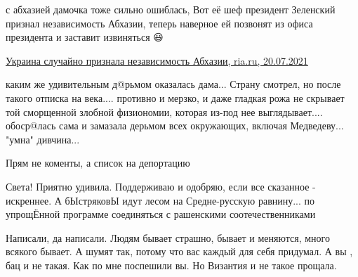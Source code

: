 \begin{itemize}
с абхазией дамочка тоже сильно ошиблась, Вот её шеф президент Зеленский признал независимость Абхазии, теперь наверное ей позвонят из офиса президента и заставит извиняться 😃

\href{https://ria.ru/20210720/priznanie-1742047208.html}{%
Украина случайно признала независимость Абхазии, ria.ru, 20.07.2021%
}

 

каким же удивительным д@рьмом оказалась дама... Страну смотрел, но после такого
отписка на века.... противно и мерзко, и даже гладкая рожа не скрывает той
сморщенной злобной физиономии, которая из-под нее выглядывает.... обоср@лась
сама и замазала дерьмом всех окружающих, включая Медведеву... "умна" дивчина...

 
Прям не коменты, а список на депортацию\Laughey[1.0][white]

 

Света! Приятно удивила. Поддерживаю и одобряю, если все сказанное - искреннее.
А бЫстряковЫ идут лесом на Средне-русскую равнину... по упрощЁнной программе
соединяться с рашенскими соотечественниками


 

Написали, да написали. Людям бывает страшно, бывает и меняются, много всякого
бывает. А шумят так, потому что вас каждый для себя придумал. А вы , бац и не
такая. Как по мне поспешили вы. Но Византия и не такое прощала.

 

\end{itemize}
